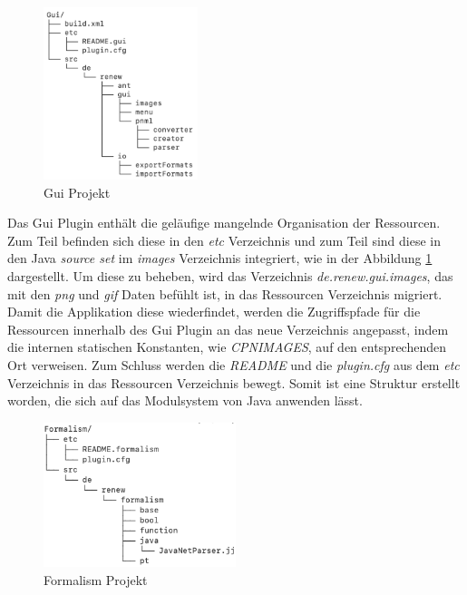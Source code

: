 	\begin{figure}[h!]
	  \centering
	  \includegraphics[width=0.4\textwidth]{material/images/gui_struktur.png}
	  \caption{Gui Projekt}
	  \label{fig:gui}
	\end{figure}


	Das Gui Plugin enthält die geläufige mangelnde Organisation der Ressourcen. Zum Teil befinden sich diese in den \textit{etc} Verzeichnis und zum Teil sind diese in den Java \textit{source set} im \textit{images} Verzeichnis integriert, wie in der Abbildung \ref{fig:gui} dargestellt.\newline
	Um diese zu beheben, wird das Verzeichnis \textit{de.renew.gui.images}, das mit den \textit{png} und \textit{gif} Daten befühlt ist, in das Ressourcen Verzeichnis migriert. Damit die Applikation diese wiederfindet, werden die Zugriffspfade für die Ressourcen innerhalb des Gui Plugin an das neue Verzeichnis angepasst, indem die internen statischen Konstanten, wie \textit{CPNIMAGES}, auf den entsprechenden Ort verweisen. \newline
	Zum Schluss werden die \textit{README} und die \textit{plugin.cfg}  aus dem \textit{etc} Verzeichnis in das Ressourcen Verzeichnis bewegt. Somit ist eine Struktur erstellt worden, die sich auf das Modulsystem von Java anwenden lässt. \bigbreak

	\begin{figure}[h!]
	  \centering
	  \includegraphics[width=0.5\textwidth]{material/images/formalism_plugin.png}
	  \caption{Formalism Projekt}
	  \label{fig:formalism}
	\end{figure}

